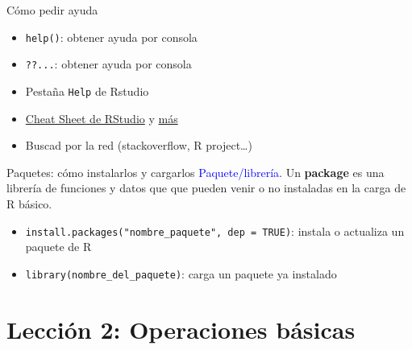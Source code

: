 \documentclass[
  ignorenonframetext,
  aspectratio=169]{beamer}
\providecommand{\tightlist}{%
  \setlength{\itemsep}{0pt}\setlength{\parskip}{0pt}}
\newcommand\blue[1]{\textcolor{blue}{#1}}
\begin{document}
\begin{frame}[fragile]{Cómo pedir ayuda}
\label{cuxf3mo-pedir-ayuda}
\begin{itemize}
\tightlist
\item
  \texttt{help()}: obtener ayuda por consola
\item
  \texttt{??...}: obtener ayuda por consola
\item
  Pestaña \texttt{Help} de Rstudio
\item
  \href{https://www.rstudio.com/wp-content/uploads/2015/02/rmarkdown-cheatsheet.pdf}{Cheat
  Sheet de RStudio} y
  \href{https://www.google.com/search?q=Cheat+Sheet++RStudio&rlz=1C1CHBF_esES891ES891&sxsrf=ALiCzsYTamg5AX36RN8EhpV8lSO55ijfRw\%3A1664221782651&ei=VgIyY5GzJ5nCa6rfovAP&ved=0ahUKEwiRtrqhnbP6AhUZ4RoKHaqvCP4Q4dUDCA4&uact=5&oq=Cheat+Sheet++RStudio&gs_lcp=Cgdnd3Mtd2l6EAMyCAgAEB4QBxATMggIABAeEAUQEzIICAAQHhAFEBMyCAgAEB4QBRATMggIABAeEAUQEzIICAAQHhAFEBMyCAgAEB4QBRATMggIABAeEAgQEzIICAAQHhAIEBMyCAgAEB4QCBATOgoIABBHENYEELADOggIABAeEAgQB0oECEEYAEoECEYYAFCmCljnC2DOEWgBcAF4AIABaogBzQGSAQMxLjGYAQCgAQHIAQjAAQE&sclient=gws-wiz}{más}
\item
  Buscad por la red (stackoverflow, R project\ldots)
\end{itemize}
\end{frame}

\begin{frame}[fragile]{Paquetes: cómo instalarlos y cargarlos}
\label{paquetes-cuxf3mo-instalarlos-y-cargarlos}
\blue{Paquete/librería}. Un \textbf{package} es una librería de
funciones y datos que que pueden venir o no instaladas en la carga de R
básico.

\begin{itemize}
\tightlist
\item
  \texttt{install.packages("nombre\_paquete",\ dep\ =\ TRUE)}: instala o
  actualiza un paquete de R
\item
  \texttt{library(nombre\_del\_paquete)}: carga un paquete ya instalado
\end{itemize}
\end{frame}

\section{Lección 2: Operaciones
básicas}\label{lecciuxf3n-2-operaciones-buxe1sicas}
\end{document}
